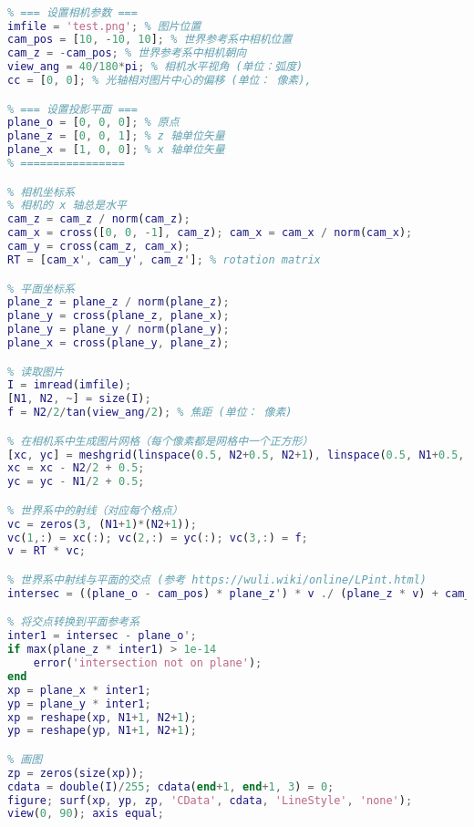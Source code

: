 \begin{lstlisting}[language=matlab, caption=art3D.m]
% 参数中矢量不必归一化

% === 设置相机参数 ===
imfile = 'test.png'; % 图片位置
cam_pos = [10, -10, 10]; % 世界参考系中相机位置
cam_z = -cam_pos; % 世界参考系中相机朝向
view_ang = 40/180*pi; % 相机水平视角 (单位：弧度)
cc = [0, 0]; % 光轴相对图片中心的偏移 (单位： 像素),

% === 设置投影平面 ===
plane_o = [0, 0, 0]; % 原点
plane_z = [0, 0, 1]; % z 轴单位矢量
plane_x = [1, 0, 0]; % x 轴单位矢量
% ================

% 相机坐标系
% 相机的 x 轴总是水平
cam_z = cam_z / norm(cam_z);
cam_x = cross([0, 0, -1], cam_z); cam_x = cam_x / norm(cam_x);
cam_y = cross(cam_z, cam_x);
RT = [cam_x', cam_y', cam_z']; % rotation matrix

% 平面坐标系
plane_z = plane_z / norm(plane_z);
plane_y = cross(plane_z, plane_x);
plane_y = plane_y / norm(plane_y);
plane_x = cross(plane_y, plane_z);

% 读取图片
I = imread(imfile);
[N1, N2, ~] = size(I);
f = N2/2/tan(view_ang/2); % 焦距 (单位： 像素)

% 在相机系中生成图片网格（每个像素都是网格中一个正方形）
[xc, yc] = meshgrid(linspace(0.5, N2+0.5, N2+1), linspace(0.5, N1+0.5, N1+1));
xc = xc - N2/2 + 0.5;
yc = yc - N1/2 + 0.5;

% 世界系中的射线（对应每个格点）
vc = zeros(3, (N1+1)*(N2+1));
vc(1,:) = xc(:); vc(2,:) = yc(:); vc(3,:) = f;
v = RT * vc;

% 世界系中射线与平面的交点 (参考 https://wuli.wiki/online/LPint.html)
intersec = ((plane_o - cam_pos) * plane_z') * v ./ (plane_z * v) + cam_pos';

% 将交点转换到平面参考系
inter1 = intersec - plane_o';
if max(plane_z * inter1) > 1e-14
    error('intersection not on plane');
end
xp = plane_x * inter1;
yp = plane_y * inter1;
xp = reshape(xp, N1+1, N2+1);
yp = reshape(yp, N1+1, N2+1);

% 画图
zp = zeros(size(xp));
cdata = double(I)/255; cdata(end+1, end+1, 3) = 0;
figure; surf(xp, yp, zp, 'CData', cdata, 'LineStyle', 'none');
view(0, 90); axis equal;
\end{lstlisting}
